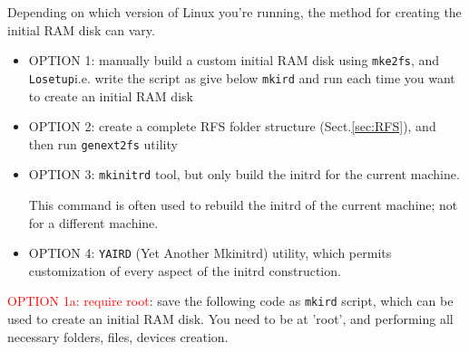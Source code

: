 Depending on which version of Linux you're running, the method for creating the
initial RAM disk can vary.
\begin{itemize}
  \item OPTION 1: manually build a custom initial RAM disk using \verb!mke2fs!,
  and \verb!Losetup!i.e.   write the script as give below \verb!mkird! and run
  each time you want to create an initial RAM disk
  
  \item OPTION 2: create a complete RFS folder structure (Sect.\ref{sec:RFS}), 
  and then run \verb!genext2fs! utility

  \item OPTION 3: \verb!mkinitrd! tool, but only build the initrd for the
  current machine.
  
  This command is often used to rebuild the initrd of the current machine; not
  for a different machine.
  
  \item OPTION 4: \verb!YAIRD! (Yet Another Mkinitrd) utility, which permits
  customization of every aspect of the initrd construction.
  
\end{itemize}

\textcolor{red}{OPTION 1a: require root}: save the following code as
\verb!mkird! script, which can be used to create an initial RAM disk. You need to be at
'root', and performing all necessary folders, files, devices creation.

